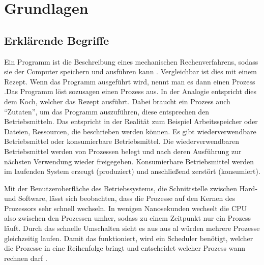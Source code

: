 \chapter{Grundlagen}
\label{grundlagen}
\section{Erklärende Begriffe}
\label{sec:begriffe}
Ein Programm ist die Beschreibung eines mechanischen Rechenverfahrens, sodass sie der Computer speichern und ausführen kann \parencite[vgl.][14]{rechenberg2000}. Vergleichbar ist dies mit einem Rezept. Wenn das Programm ausgeführt wird, nennt man es dann einen Prozess \parencite[vgl.][S.71]{tanenbaum2016}.Das Programm löst sozusagen einen Prozess aus. In der Analogie entspricht dies dem Koch, welcher das Rezept ausführt.  Dabei braucht ein Prozess auch “Zutaten”, um das Programm auszuführen, diese entsprechen den Betriebsmitteln. Das entspricht in der Realität zum Beispiel Arbeitsspeicher oder Dateien, Ressourcen, die beschrieben werden können. Es gibt wiederverwendbare Betriebsmittel oder konsumierbare Betriebsmittel. Die wiederverwendbaren Betriebsmittel werden von Prozessen belegt und nach deren Ausführung zur nächsten Verwendung  wieder freigegeben. Konsumierbare Betriebsmittel werden im laufenden System erzeugt (produziert) und anschließend zerstört (konsumiert).


Mit der Benutzeroberfläche des Betriebssystems, die Schnittstelle zwischen Hard- und Software, lässt sich beobachten, dass die Prozesse auf den Kernen des Prozessors sehr schnell wechseln. In wenigen Nanosekunden wechselt die CPU also zwischen den Prozessen umher, sodass zu einem Zeitpunkt nur ein Prozess läuft. Durch das schnelle Umschalten sieht es aus aus al würden mehrere Prozesse gleichzeitig laufen. Damit  das funktioniert, wird ein Scheduler benötigt, welcher die Prozesse in eine Reihenfolge bringt und entscheidet welcher Prozess wann rechnen darf \parencite[vgl.][S.199]{tanenbaum2016}.

